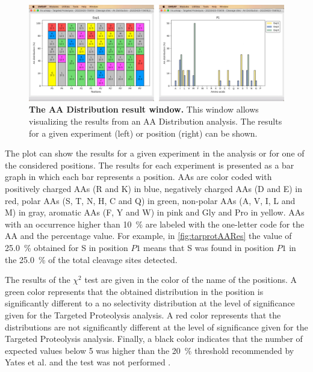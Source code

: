 \begin{figure}[h]
    \centering
    \includegraphics[width=1.0\textwidth]{./IMAGES/MOD-TARPROT/tarprot-aa.jpg}
    \caption[The AA Distribution result window]{\textbf{The AA Distribution result
    window.} This window allows visualizing the results from an AA Distribution
    analysis. The results for a given experiment (left) or position (right) can
    be shown.}
    \label{fig:tarprotAARes}
    \vspace{-5pt}
\end{figure}

The plot can show the results for a given experiment in the analysis or for one of
the considered positions.
The results for each experiment is presented as a bar graph in which each bar
represents a position. AAs are color coded with positively charged
AAs (R and K) in blue, negatively charged AAs (D and E) in red, polar AAs (S, T,
N, H, C and Q) in green, non-polar AAs (A, V, I, L and M) in gray, aromatic AAs
(F, Y and W) in pink and Gly and Pro in yellow. AAs with an occurrence higher than
\SI{10}{\percent} are labeled with the one-letter code for the AA and the percentage
value. For example, in \autoref{fig:tarprotAARes} the value of \SI{25.0}{\percent}
obtained for S in position \(P1\) means that S was found in position \(P1\) in the
\SI{25.0}{\percent} of the total cleavage sites detected.

The results of the $\chi^2$ test are given in the color of the name of the positions.
A green color represents that the obtained distribution in the position is significantly
different to a no selectivity distribution at the level of significance given for
the Targeted Proteolysis analysis. A red color represents that the distributions are
not significantly different at the level of significance given for the Targeted
Proteolysis analysis. Finally, a black color indicates that the number of expected
values below 5 was higher than the \SI{20}{\percent} threshold recommended by Yates
et al. and the test was not performed \cite{Yates1999}.

